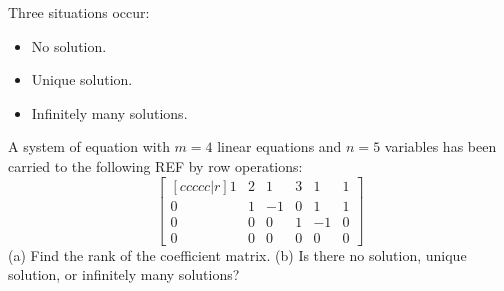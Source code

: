 \documentclass[20pt,a4paper]{extarticle}
\newcounter{example}[section]
\begin{document}
\vspace*{20pt}

Three situations occur:
	\begin{itemize}
		\item No solution. 
		\item Unique solution.
		\item Infinitely many solutions.
	\end{itemize}

\begin{example}
A system of equation with $m = 4$ linear equations and $n = 5$ variables has been  carried to the following REF by row operations:
	\[
		\begin{bmatrix}[ccccc|r]
		1 & 2 & 1 & 3 & 1 & 1 \\ 
		0 & 1 & -1 & 0 & 1 & 1 \\ 
		0 & 0 & 0 & 1 & -1 & 0 \\ 
		0 & 0 & 0 & 0 & 0 & 0
		\end{bmatrix}
	\]
(a) Find the rank of the coefficient matrix. (b) Is there no solution, unique solution, or infinitely many solutions?
\end{example}

\begin{solution}

\end{solution}
\end{document}
